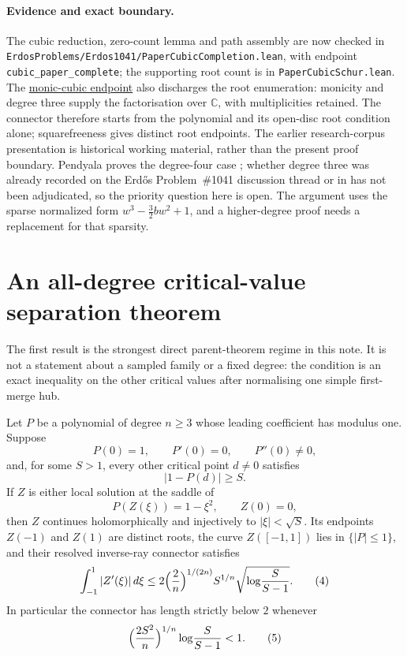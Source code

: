 \documentclass[11pt]{article}
\begin{document}
\paragraph{Evidence and exact boundary.}
\label{bdry:degree-three}
The cubic reduction, zero-count lemma and path assembly are now checked in
\texttt{ErdosProblems/Erdos1041/PaperCubicCompletion.lean}, with endpoint
\texttt{cubic\_paper\_complete}; the supporting root count is in
\texttt{PaperCubicSchur.lean}. The
\href{https://github.com/wcook04/plectis-erdos/blob/3be82b1a7340284aea72e9a5c8493cb020843921/ErdosProblems/Erdos1041/PaperCubicMonic.lean#L32}{monic-cubic endpoint} also discharges the root enumeration:
monicity and degree three supply the factorisation over $\mathbb C$, with
multiplicities retained.  The connector therefore starts from the polynomial
and its open-disc root condition alone; squarefreeness gives distinct root
endpoints. The earlier research-corpus presentation is
historical working material, rather than the present proof boundary.  Pendyala proves the
degree-four case \cite[Thm.~1, p.~1]{june2026}; whether degree three was
already recorded on the Erd\H{o}s Problem~\#1041 discussion thread or in
\cite{ehp1958} has not been adjudicated, so the priority question here is
open.  The argument uses the sparse normalized form $w^3-\tfrac32bw^2+1$,
and a higher-degree proof needs a replacement for that sparsity.

\section{An all-degree critical-value separation theorem}
\label{sec:critical-value-separation}

The first result is the strongest direct parent-theorem regime in this note.
It is not a statement about a sampled family or a fixed degree: the condition
is an exact inequality on the other critical values after normalising one
simple first-merge hub.

\begin{theorem}
\label{res:critical-value-separation}
Let $P$ be a polynomial of degree $n\ge3$ whose leading coefficient has
modulus one.  Suppose
\[
 P(0)=1,\qquad P'(0)=0,\qquad P''(0)\ne0,
\]
and, for some $S>1$, every other critical point $d\ne0$ satisfies
\[
 |1-P(d)|\ge S.
\]
If $Z$ is either local solution at the saddle of
\[
 P(Z(\xi))=1-\xi^2,\qquad Z(0)=0,
\]
then $Z$ continues holomorphically and injectively to
$|\xi|<\sqrt S$.  Its endpoints $Z(-1)$ and $Z(1)$ are distinct roots, the
curve $Z([-1,1])$ lies in $\{|P|\le1\}$, and their resolved inverse-ray
connector satisfies
\[
 \int_{-1}^{1}|Z'(\xi)|\,d\xi
 \le 2\Bigl(\frac2n\Bigr)^{1/(2n)}S^{1/n}
     \sqrt{\log\!\frac{S}{S-1}}.       \tag{4}
\]
In particular the connector has length strictly below $2$ whenever
\[
 \Bigl(\frac{2S^{2}}{n}\Bigr)^{1/n}\log\!\frac{S}{S-1}<1. \tag{5}
\]
\end{theorem}
\end{document}
